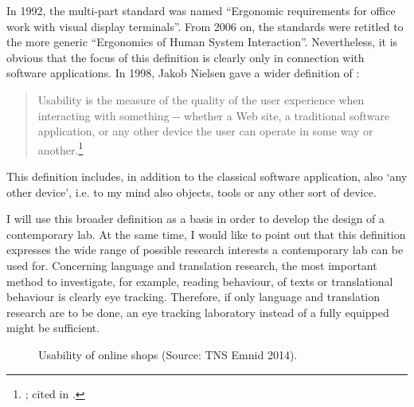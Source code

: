 \documentclass[output=paper]{langsci/langscibook}
\begin{document}
In 1992, the multi-part standard was named ``Ergonomic requirements for office work with visual display terminals''. From 2006 on, the standards were retitled to the more generic ``Ergonomics of Human System Interaction''. Nevertheless, it is obvious that the focus of this definition is clearly only  in connection with software applications. In 1998, Jakob Nielsen gave a wider definition of :

\begin{quote}
Usability is the measure of the quality of the user experience when interacting with something -{}- whether a Web site, a traditional software application, or any other device the user can operate in some way or another.\footnote{ \citet{Nielsen1998}; cited in \citet{Eichinger1999}.}
\end{quote}

This definition includes, in addition to the classical software application, also `any other device', i.e. to my mind also objects, tools or any other sort of device. 

\largerpage
I will use this broader definition as a basis in order to develop the design of a contemporary  lab. At the same time, I would like to point out that this definition expresses the wide range of possible research interests a contemporary  lab can be used for. Concerning language and translation research, the most important method to investigate, for example, reading behaviour,  of texts or translational behaviour is clearly eye tracking. Therefore, if only language and translation research are to be done, an eye tracking laboratory instead of a fully equipped  might be sufficient.

  
\begin{figure}[t]
 

 \caption{Usability of online shops (Source: TNS Emnid 2014).}
 \label{roesener:fig:1}
\end{figure} 
 
\end{document}
